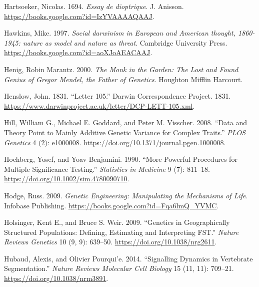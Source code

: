 \documentclass[
]{book}
\newlength{\cslhangindent}
\newlength{\cslentryspacingunit} %
\newenvironment{CSLReferences}[2] %
 {%
  \setlength{\parindent}{0pt}
  \ifodd #1
  \let\oldpar\par
  \def\par{\hangindent=\cslhangindent\oldpar}
  \fi
  \setlength{\parskip}{#2\cslentryspacingunit}
 }%
 {}
\begin{document}
\begin{CSLReferences}{1}{0}
\leavevmode{}%
Hartsoeker, Nicolas. 1694. \emph{Essay de dioptrique}. {J. Anisson}. \url{https://books.google.com?id=IzYVAAAAQAAJ}.

\leavevmode{}%
Hawkins, Mike. 1997. \emph{Social darwinism in European and American thought, 1860-1945: nature as model and nature as threat}. {Cambridge University Press}. \url{https://books.google.com?id=aoXJoAEACAAJ}.

\leavevmode{}%
Henig, Robin Marantz. 2000. \emph{The {Monk} in the {Garden}: {The Lost} and {Found Genius} of {Gregor Mendel}, the {Father} of {Genetics}}. {Houghton Mifflin Harcourt}.

\leavevmode{}%
Henslow, John. 1831. {``Letter 105.''} {Darwin Correspondence Project}. 1831. \url{https://www.darwinproject.ac.uk/letter/DCP-LETT-105.xml}.

\leavevmode{}%
Hill, William G., Michael E. Goddard, and Peter M. Visscher. 2008. {``Data and {Theory Point} to {Mainly Additive Genetic Variance} for {Complex Traits}.''} \emph{PLOS Genetics} 4 (2): e1000008. \url{https://doi.org/10.1371/journal.pgen.1000008}.

\leavevmode{}%
Hochberg, Yosef, and Yoav Benjamini. 1990. {``More Powerful Procedures for Multiple Significance Testing.''} \emph{Statistics in Medicine} 9 (7): 811--18. \url{https://doi.org/10.1002/sim.4780090710}.

\leavevmode{}%
Hodge, Russ. 2009. \emph{Genetic {Engineering}: {Manipulating} the {Mechanisms} of {Life}}. {Infobase Publishing}. \url{https://books.google.com?id=Fqa6lmQ_YVMC}.

\leavevmode{}%
Holsinger, Kent E., and Bruce S. Weir. 2009. {``Genetics in Geographically Structured Populations: Defining, Estimating and Interpreting {FST}.''} \emph{Nature Reviews Genetics} 10 (9, 9): 639--50. \url{https://doi.org/10.1038/nrg2611}.

\leavevmode{}%
Hubaud, Alexis, and Olivier Pourqui'e. 2014. {``Signalling Dynamics in Vertebrate Segmentation.''} \emph{Nature Reviews Molecular Cell Biology} 15 (11, 11): 709--21. \url{https://doi.org/10.1038/nrm3891}.


\end{CSLReferences}
\end{document}
